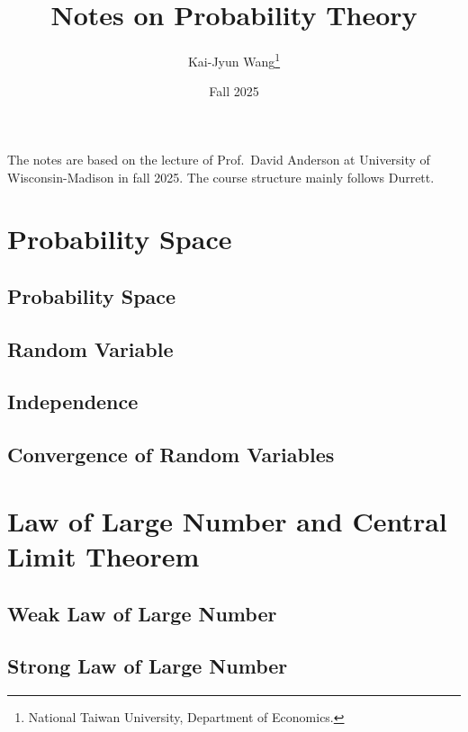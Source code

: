 \documentclass[a4paper, 12pt]{article}
\title{Notes on Probability Theory}
\author{Kai-Jyun Wang\thanks{National Taiwan University, Department of Economics.}}
\date{Fall 2025}
\begin{document}
 
\maketitle

The notes are based on the lecture of Prof.\ David Anderson at University of Wisconsin-Madison 
in fall 2025. The course structure mainly follows Durrett. 

\newpage 
\tableofcontents
\newpage

\section{Probability Space}
\subsection{Probability Space}

\newpage

\subsection{Random Variable}

\newpage

\subsection{Independence}

\newpage

\subsection{Convergence of Random Variables}

\newpage

\section{Law of Large Number and Central Limit Theorem}

\subsection{Weak Law of Large Number}

\newpage

\subsection{Strong Law of Large Number}

\newpage
\end{document}
